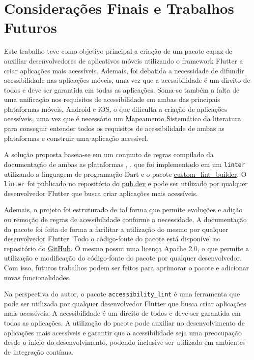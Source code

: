 \chapter{Considerações Finais e Trabalhos Futuros}

Este trabalho teve como objetivo principal a criação de um pacote capaz de auxiliar desenvolvedores de aplicativos móveis utilizando o framework Flutter a criar aplicações mais acessíveis. Ademais, foi debatida a necessidade de difundir acessibilidade nas aplicações móveis, uma vez que a acessibilidade é um direito de todos e deve ser garantida em todas as aplicações. Soma-se também a falta de uma unificação nos requisitos de acessibilidade em ambas das principais plataformas móveis, Android e iOS, o que dificulta a criação de aplicações acessíveis, uma vez que é necessário um Mapeamento Sistemático da literatura para conseguir entender todos os requisitos de acessibilidade de ambas as plataformas e construir uma aplicação acessível.

A solução proposta baseia-se em um conjunto de regras compilado da documentação de ambas as plataformas \cite{iosaccessibility}, \cite{androidaccessibility}, que foi implementado em um \texttt{linter} utilizando a linguagem de programação Dart e o pacote \href{https://pub.dev/packages/custom_lint_builder}{custom\_lint\_builder}. O \texttt{linter} foi publicado no repositório do \href{https://pub.dev/packages/accessibility_lint}{pub.dev} e pode ser utilizado por qualquer desenvolvedor Flutter que busca criar aplicações mais acessíveis.

Ademais, o projeto foi estruturado de tal forma que permite evoluções e adição ou remoção de regras de acessibilidade conforme a necessidade. A documentação do pacote foi feita de forma a facilitar a utilização do mesmo por qualquer desenvolvedor Flutter. Todo o código-fonte do pacote está disponível no repositório do \href{https://github.com/MateuxLucax/accessibility-lint}{GitHub}. O mesmo possui uma licença Apache 2.0, o que permite a utilização e modificação do código-fonte do pacote por qualquer desenvolvedor. Com isso, futuros trabalhos podem ser feitos para aprimorar o pacote e adicionar novas funcionalidades.

Na perspectiva do autor, o pacote \texttt{accessibility\_lint} é uma ferramenta que pode ser utilizada por qualquer desenvolvedor Flutter que busca criar aplicações mais acessíveis. A acessibilidade é um direito de todos e deve ser garantida em todas as aplicações. A utilização do pacote pode auxiliar no desenvolvimento de aplicações mais acessíveis e garantir que a acessibilidade seja uma preocupação desde o início do desenvolvimento, podendo inclusive ser utilizada em ambientes de integração contínua.